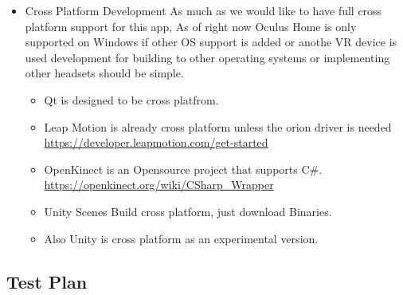 \documentclass[a4paper,10pt]{article}
\begin{document}
\begin{itemize}
\begin{itemize}
  \end{itemize}
  \item Cross Platform Development
  As much as we would like to have full cross platform support for this app, As of right now 
  Oculus Home is only supported on Windows if other OS support 
  is added or anothe VR device is used development for building to other operating systems or
  implementing other headsets should be simple.
  \begin{itemize}
  \item Qt is designed to be cross platfrom. 
  \item Leap Motion is already cross platform unless the orion driver is needed
  ~\\\url{https://developer.leapmotion.com/get-started}
    \item OpenKinect is an Opensource project that supports C\#.
  \url{https://openkinect.org/wiki/CSharp_Wrapper}
  \item Unity Scenes Build cross platform, just download Binaries.\
  \item Also Unity is cross platform as an experimental version.
  \end{itemize}
\end{itemize}
\pagebreak
\subsection{Test Plan}
\end{document}
